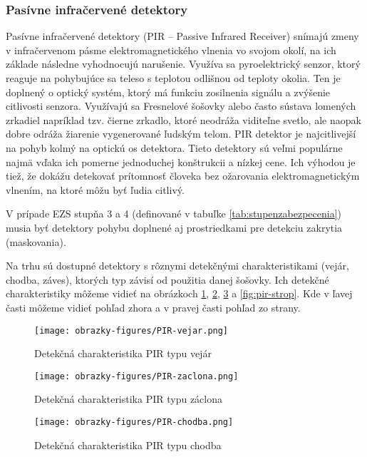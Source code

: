 \subsubsection{Pasívne infračervené detektory}

Pasívne infračervené detektory (PIR – Passive Infrared Receiver) snímajú zmeny v infračervenom pásme elektromagnetického vlnenia vo svojom okolí, na ich základe následne vyhodnocujú narušenie. Využíva sa pyroelektrický senzor, ktorý reaguje na pohybujúce sa teleso s teplotou odlišnou od teploty okolia. Ten je doplnený o optický systém, ktorý má funkciu zosilnenia signálu a zvýšenie citlivosti senzora. Využívajú sa Fresnelové šošovky alebo často sústava lomených zrkadiel napríklad tzv. čierne zrkadlo, ktoré neodráža viditeľne svetlo, ale naopak dobre odráža žiarenie vygenerované ľudským telom. PIR detektor je najcitlivejší na pohyb kolmý na optickú os detektora. Tieto detektory sú veľmi populárne najmä vďaka ich pomerne jednoduchej konštrukcii a nízkej cene. Ich výhodou je tiež, že dokážu detekovať prítomnosť človeka bez ožarovania elektromagnetickým vlnením, na ktoré môžu byť ľudia citlivý.\cite{velas_ezs}

V prípade EZS stupňa 3 a 4 (definované v tabuľke \ref{tab:stupenzabezpecenia}) musia byť detektory pohybu doplnené aj prostriedkami pre detekciu zakrytia (maskovania).\cite{csn-en-50131-1}

Na trhu sú dostupné detektory s rôznymi detekčnými charakteristikami (vejár, chodba, záves),
ktorých typ závisí od použitia danej šošovky. Ich detekčné charakteristiky môžeme vidieť na obrázkoch \ref{fig:pir-vejar}, \ref{fig:pir-zaclona}, \ref{fig:pir-chodba} a \ref{fig:pir-strop}. Kde v ľavej časti môžeme vidieť pohľad zhora a v pravej časti pohľad zo strany.

\begin{figure}[ht]
    \centering
    \texttt{[image: obrazky-figures/PIR-vejar.png]}
    \caption{Detekčná charakteristika PIR typu vejár\cite{PIR-vejar}}
    \label{fig:pir-vejar}
\end{figure}

\begin{figure}[ht]
    \centering
    \texttt{[image: obrazky-figures/PIR-zaclona.png]}
    \caption{Detekčná charakteristika PIR typu záclona\cite{velas_ezs}}
    \label{fig:pir-zaclona}
\end{figure}

\begin{figure}[ht]
    \centering
    \texttt{[image: obrazky-figures/PIR-chodba.png]}
    \caption{Detekčná charakteristika PIR typu chodba\cite{velas_ezs}}
    \label{fig:pir-chodba}
\end{figure}

